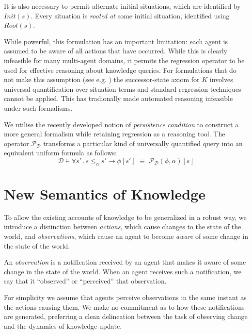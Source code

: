 \documentclass{ifaamas-submission}
\begin{document}
It is also necessary to permit alternate initial situations, which are
identified by $Init(s)$. Every situation is \emph{rooted at}
some initial situation, identified using $Root(s)$.

While powerful, this formulation has an important limitation: each
agent is assumed to be aware of all actions that have occurred.
While this is clearly infeasible for many multi-agent domains, it permits
the regression operator \cite{pirri99contributions_sitcalc} to be used
for effective reasoning about knowledge queries.
For formulations that do not make this assumption (see e.g. 
 \cite{Lesperance99sitcalc_approach}) the successor-state axiom for $K$
involves universal quantification over situation terms and standard
regression techniques cannot be applied.  This has tradionally made
automated reasoning infeasible under such formalisms.

We utilise the recently developed notion of \emph{persistence condition}
\cite{kelly07sc_persistence} to construct a more general formalism while
retaining regression as a reasoning tool.  The operator 
$\mathcal{P}_{\mathcal{D}}$ transforms a particular kind of universally
quantified query into an equivalent uniform formula as follows:
\begin{equation}
\mathcal{D} \models \forall s'\,.\,s \leq_{\alpha} s' \rightarrow \phi[s']\,\,\equiv\,\, \mathcal{P}_{\mathcal{D}}(\phi,\alpha)[s]
\end{equation}

\section{New Semantics of Knowledge}

\label{sec:New-Semantics}

To allow the existing accounts of knowledge to be generalized in a robust way,
we introduce
a distinction between \emph{actions}, which cause changes to the state
of the world, and \emph{observations}, which cause an agent to become
\emph{aware} of some change in the state of the world.
\begin{definition}
An \emph{observation} is a notification received by an agent that
makes it aware of some change in the state of the world. When an agent
receives such a notification, we say that it {}``observed'' or {}``perceived''
that observation.
\end{definition}
For simplicity we assume that agents perceive observations 
in the same instant as the actions causing them. We make
no commitment as to how these notifications are generated, preferring
a clean delineation between the task of observing change and the dynamics
of knowledge update.
\end{document}

